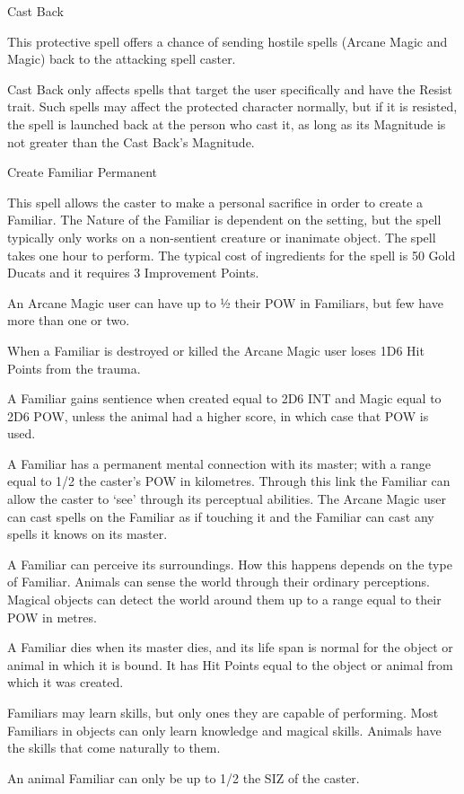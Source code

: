 \begin{samepage}
\begin{rpg-spell}
{Cast Back}
{}

This protective spell offers a chance of sending hostile spells (Arcane Magic and Magic) back to the attacking spell caster. 

Cast Back only affects spells that target the user specifically and have the Resist trait. Such spells may affect the protected character normally, but if it is resisted, the spell is launched back at the person who cast it, as long as its Magnitude is not greater than the Cast Back’s Magnitude. 
\end{rpg-spell}
\end{samepage}


\begin{samepage}
\begin{rpg-spell}
{Create Familiar}
{Permanent}

This spell allows the caster to make a personal sacrifice in order to create a Familiar. The Nature of the Familiar is dependent on the setting, but the spell typically only works on a non-sentient creature or inanimate object. The spell takes one hour to perform. The typical cost of ingredients for the spell is 50 Gold Ducats and it requires 3 Improvement Points. 

\begin{rpg-list}
\item An Arcane Magic user can have up to ½ their POW in Familiars, but few have more than one or two.
\item When a Familiar is destroyed or killed the Arcane Magic user loses 1D6 Hit Points from the trauma.
\item A Familiar gains sentience when created equal to 2D6 INT and Magic equal to 2D6 POW, unless the animal had a higher score, in which case that POW is used. 
\item A Familiar has a permanent mental connection with its master; with a range equal to 1/2 the caster’s POW in kilometres. Through this link the Familiar can allow the caster to ‘see’ through its perceptual abilities. The Arcane Magic user can cast spells on the Familiar as if touching it and the Familiar can cast any spells it knows on its master.
\item A Familiar can perceive its surroundings. How this happens depends on the type of Familiar. Animals can sense the world through their ordinary perceptions. Magical objects can detect the world around them up to a range equal to their POW in metres.
\item A Familiar dies when its master dies, and its life span is normal for the object or animal in which it is bound. It has Hit Points equal to the object or animal from which it was created.
\item Familiars may learn skills, but only ones they are capable of performing. Most Familiars in objects can only learn knowledge and magical skills. Animals have the skills that come naturally to them.
\item An animal Familiar can only be up to 1/2 the SIZ of the caster. 
\end{rpg-list}


\end{rpg-spell}
\end{samepage}
